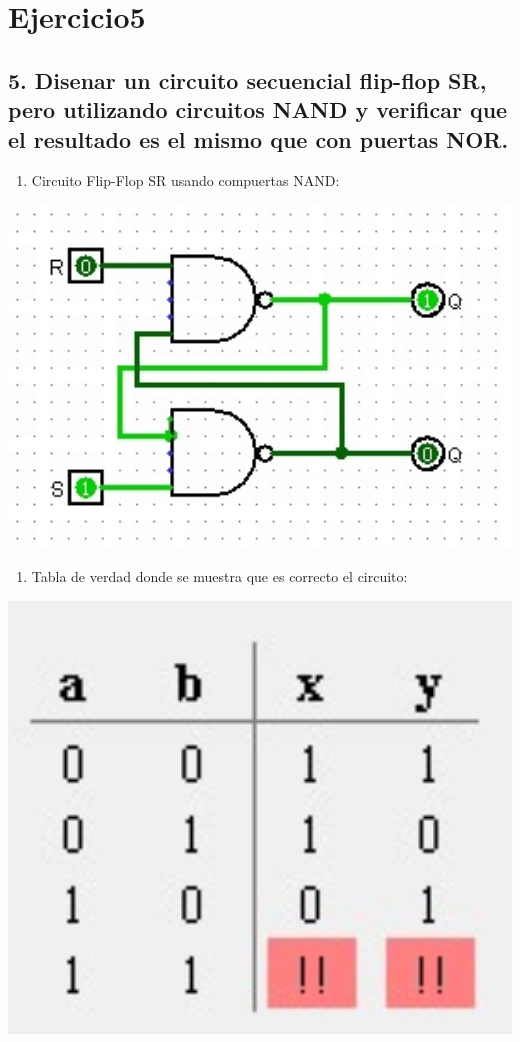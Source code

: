 \chapter*{Ejercicio5}
\section*{5. Disenar un circuito secuencial flip-flop SR, pero utilizando circuitos NAND y
verificar que el resultado es el mismo que con puertas NOR.}

\begin{enumerate}
    \item 
Circuito Flip-Flop SR usando compuertas NAND:
\end{enumerate}

\begin{center}
    \includegraphics[width=1\textwidth]{recursos/Ejercicio5.png}
\end{center}

\begin{enumerate}
    \item 
    Tabla de verdad donde se muestra que es correcto el circuito:
\end{enumerate}


\begin{center}
    \includegraphics[width=1\textwidth]{recursos/TablaEjercicio5.png}
\end{center}
    

